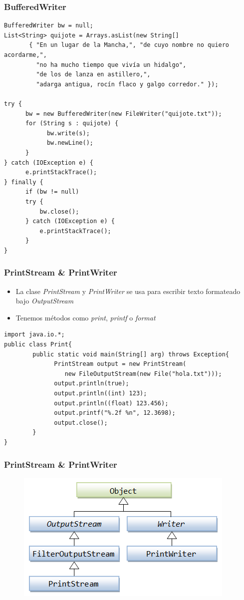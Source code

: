 \documentclass{beamer}
\begin{document}
\begin{frame}[fragile]
\frametitle{BufferedWriter}
\begin{scriptsize}

\begin{verbatim}
BufferedWriter bw = null;
List<String> quijote = Arrays.asList(new String[]
       { "En un lugar de la Mancha,", "de cuyo nombre no quiero acordarme,",
         "no ha mucho tiempo que vivía un hidalgo",
         "de los de lanza en astillero,", 
         "adarga antigua, rocín flaco y galgo corredor." });

try {
      bw = new BufferedWriter(new FileWriter("quijote.txt"));
      for (String s : quijote) {
            bw.write(s);
            bw.newLine();
      }
} catch (IOException e) {
      e.printStackTrace();
} finally {
      if (bw != null)
      try {
          bw.close();
      } catch (IOException e) {
          e.printStackTrace();
      }
}
\end{verbatim}
\end{scriptsize}
\end{frame}

\begin{frame}[fragile]
\frametitle{PrintStream \& PrintWriter}
\begin{itemize}[<+->]
\item La clase \emph{PrintStream} y \emph{PrintWriter} se usa para escribir texto formateado bajo \emph{OutputStream}
\item Tenemos métodos como \emph{print}, \emph{printf} o \emph{format}
\end{itemize}
\pause
\begin{small}
\begin{verbatim}
import java.io.*;
public class Print{
        public static void main(String[] arg) throws Exception{
              PrintStream output = new PrintStream(
                 new FileOutputStream(new File("hola.txt")));
              output.println(true);
              output.println((int) 123);
              output.println((float) 123.456);
              output.printf("%.2f %n", 12.3698);
              output.close();
        }
}
\end{verbatim}
\end{small}
\end{frame}

\begin{frame}
\frametitle{PrintStream \& PrintWriter}
\begin{figure}
\includegraphics[scale=0.8]{imagenes/PW.png}
\end{figure}
\end{frame}
\end{document}

